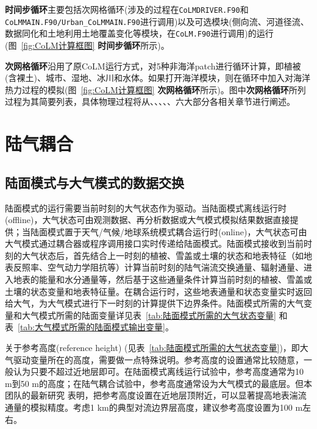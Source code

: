 \textbf{时间步循环}主要包括次网格循环(涉及的过程在\texttt{CoLMDRIVER.F90}和\texttt{CoLMMAIN.F90\allowbreak /Urban\allowbreak \_CoLMMAIN.F90}进行调用)以及可选模块(侧向流、河道径流、数据同化和土地利用土地覆盖变化等模块，在\texttt{CoLM.F90}进行调用)的运行(图~\ref{fig:CoLM计算框图} \textbf{时间步循环}所示)。

\textbf{次网格循环}沿用了原CoLM运行方式，对5种非海洋patch进行循环计算，即植被(含裸土)、城市、湿地、冰川和水体。如果打开海洋模块，则在循环中加入对海洋热力过程的模拟(图~\ref{fig:CoLM计算框图} \textbf{次网格循环}所示)。图中\textbf{次网格循环}所列过程为其简要列表，具体物理过程将从、、、、、六大部分各相关章节进行阐述。

\section{陆气耦合}\label{陆气耦合}
\subsection{陆面模式与大气模式的数据交换}
陆面模式的运行需要当前时刻的大气状态作为驱动。当陆面模式离线运行时(offline)，大气状态可由观测数据、再分析数据或大气模式模拟结果数据直接提供；当陆面模式置于天气/气候/地球系统模式耦合运行时(online)，大气状态可由大气模式通过耦合器或程序调用接口实时传递给陆面模式。陆面模式接收到当前时刻的大气状态后，首先结合上一时刻的植被、雪盖或土壤的状态和地表特征（如地表反照率、空气动力学阻抗等）计算当前时刻的陆气湍流交换通量、辐射通量、进入地表的能量和水分通量等，然后基于这些通量条件计算当前时刻的植被、雪盖或土壤的状态变量和地表特征量。在耦合运行时，这些地表通量和状态变量实时返回给大气，为大气模式进行下一时刻的计算提供下边界条件。陆面模式所需的大气变量和大气模式所需的陆面变量详见表~\ref{tab:陆面模式所需的大气状态变量} 和表~\ref{tab:大气模式所需的陆面模式输出变量}。

关于参考高度(reference height) (见表~\ref{tab:陆面模式所需的大气状态变量})，即大气驱动变量所在的高度，需要做一点特殊说明。参考高度的设置通常比较随意，一般认为只要不超过近地层即可。在陆面模式离线运行试验中，参考高度通常为10 m到50 m的高度；在陆气耦合试验中，参考高度通常设为大气模式的最底层。但本团队的最新研究\citep{liu2023referenceheight} 表明，把参考高度设置在近地层顶附近，可以显著提高地表湍流通量的模拟精度。考虑1 km的典型对流边界层高度，建议参考高度设置为100 m左右。

